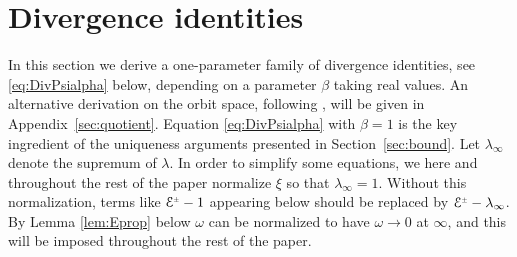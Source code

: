 \documentclass[a4paper,10pt,reqno]{amsart}
\newcommand{\cE}{\mathcal{E}}
\theoremstyle{plain}
\newcommand{\PM}[1]{{{#1}^{\hspace{-.5pt}\scaleto{\pm}{3.5pt}}}}
\numberwithin{equation}{section}
\begin{document}
%
%
%
%
%
%
%
%



\section{Divergence identities} \label{sec:divident}
In this section 
we derive a one-parameter family of divergence identities, see  \eqref{eq:DivPsialpha} below, depending on a parameter $\beta$ taking real values. An alternative derivation on the orbit space, following \cite{MR747036,simon:1995}, will be given in Appendix~\ref{sec:quotient}.  Equation \eqref{eq:DivPsialpha} with $\beta =1$ is the key ingredient of the uniqueness arguments presented in Section~\ref{sec:bound}. 
Let $\lambda_\infty$ denote the supremum of $\lambda$.
In order to simplify some equations, we here and throughout the rest of the paper normalize $\xi$ so that $\lambda_\infty = 1$. 
Without this normalization, terms like $\PM{\cE} - 1$ appearing below should be replaced by 
$\PM{\cE}-\lambda_\infty$. By Lemma \ref{lem:Eprop} below $\omega$ can be normalized to have $\omega \rightarrow 0$ at $\infty$, and this will be imposed throughout the rest of the paper. 
\end{document}
